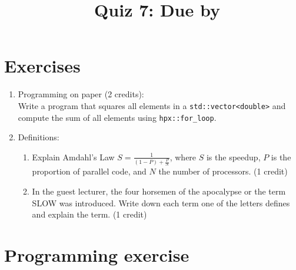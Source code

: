 \documentclass[11pt]{article}
\begin{document}
\title{\coursename~Quiz 7: Due by }
\date{}
\maketitle

\medskip


\section*{Exercises}

\begin{enumerate}
\item Programming on paper (2 credits): \\
Write a program that squares all elements in a \lstinline|std::vector<double>| and compute the sum of all elements using \lstinline|hpx::for_loop|. 


\item Definitions: \\
\begin{enumerate}
\item Explain Amdahl's Law $S=\frac{1}{(1-P)+\frac{P}{N}}$, where $S$ is the speedup, $P$ is the proportion of parallel code, and $N$ the number of processors. (1 credit)
\item In the guest lecturer, the four horsemen of the apocalypse or the term SLOW was introduced. Write down each term one of the letters defines and explain the term. (1 credit)
\end{enumerate}



\end{enumerate}

\section*{Programming exercise}
\end{document}
